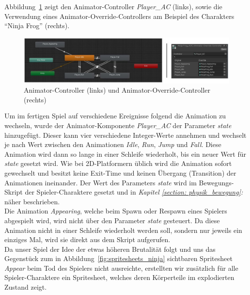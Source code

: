 Abbildung~\ref{fig:ac-aoc} zeigt den Animator-Controller \textit{Player\_AC} (links), sowie die Verwendung eines Animator-Override-Controllers am Beispiel des Charakters \enquote{Ninja Frog} (rechts).\\

\begin{figure}[th]
\centering
\includegraphics[width=150mm]{Figures/ac-aoc.jpg}
\decoRule
\caption[Animator-Controller und Animator-Override-Controller]{Animator-Controller (links) und Animator-Override-Controller (rechts)}
\label{fig:ac-aoc}
\end{figure}

Um im fertigen Spiel auf verschiedene Ereignisse folgend die Animation zu wechseln, wurde der Animator-Komponente \textit{Player\_AC} der Parameter \textit{state} hinzugefügt. Dieser kann vier verschiedene Integer-Werte annehmen und wechselt je nach Wert zwischen den Animationen \textit{Idle}, \textit{Run}, \textit{Jump} und \textit{Fall}. Diese Animation wird dann so lange in einer Schleife wiederholt, bis ein neuer Wert für \textit{state} gesetzt wird. Wie bei 2D-Platformern üblich wird die Animation sofort gewechselt und besitzt keine Exit-Time und keinen Übergang (Transition) der Animationen ineinander. Der Wert des Parameters \textit{state} wird im Bewegungs-Skript der Spieler-Charaktere gesetzt und in \textit{Kapitel \ref{section: physik_bewegung}: } näher beschrieben.\\

Die Animation \textit{Appearing}, welche beim Spawn oder Respawn eines Spielers abgespielt wird, wird nicht über den Parameter \textit{state} gesteuert. Da diese Animation nicht in einer Schleife wiederholt werden soll, sondern nur jeweils ein einziges Mal, wird sie direkt aus dem Skript aufgerufen.\\

Da unser Spiel der Idee der etwas höheren Brutalität folgt und uns das Gegenstück zum in Abbildung~\ref{fig:spritesheets_ninja} sichtbaren Spritesheet \textit{Appear} beim Tod des Spielers nicht ausreichte, erstellten wir zusätzlich für alle Spieler-Charaktere ein Spritesheet, welches deren Körperteile im explodierten Zustand zeigt. \\


